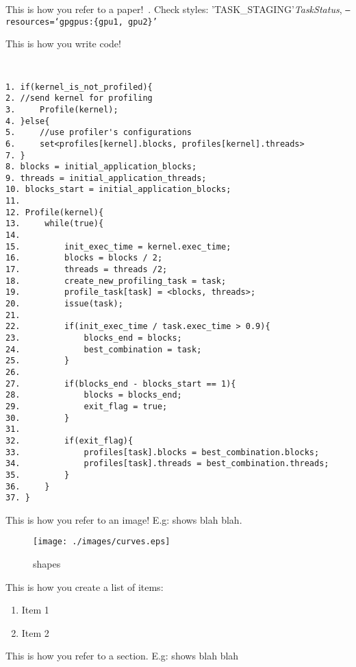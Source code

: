 This is how you refer to a paper!~\cite{quasar}. Check styles: {'TASK\_STAGING'}\textit{TaskStatus}, \texttt{--resources=\lq{gpgpus:\{gpu1, gpu2\}}\rq} 


This is how you write code!
{\tt \small
\begin{verbatim}
1. if(kernel_is_not_profiled){
2. //send kernel for profiling
3.     Profile(kernel);
4. }else{
5.     //use profiler's configurations
6.     set<profiles[kernel].blocks, profiles[kernel].threads>
7. }
8. blocks = initial_application_blocks;
9. threads = initial_application_threads;
10. blocks_start = initial_application_blocks;
11. 
12. Profile(kernel){
13.     while(true){
14.     
15.         init_exec_time = kernel.exec_time;
16.         blocks = blocks / 2;
17.         threads = threads /2;
18.         create_new_profiling_task = task;
19.         profile_task[task] = <blocks, threads>;
20.         issue(task);
21.         
22.         if(init_exec_time / task.exec_time > 0.9){
23.             blocks_end = blocks;
24.             best_combination = task;
25.         }
26.         
27.         if(blocks_end - blocks_start == 1){
28.             blocks = blocks_end;
29.             exit_flag = true;
30.         }
31.         
32.         if(exit_flag){
33.             profiles[task].blocks = best_combination.blocks;
34.             profiles[task].threads = best_combination.threads;
35.         }
36.     }
37. }                                                                                                                                                                                                        
\end{verbatim}
}



This is how you refer to an image! E.g:  shows blah blah.
\begin{figure}[htb]
	\centering
	\texttt{[image: ./images/curves.eps]}
	\caption{\perfindex{} shapes}
	\label{fig:performance_index}
\end{figure}



This is how you create a list of items:
\begin{enumerate}
\item Item 1
\item Item 2
\end{enumerate}



This is how you refer to a section. E.g:  shows blah blah



